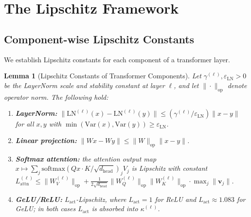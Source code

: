 \documentclass[11pt]{article}
\newtheorem{lemma}{Lemma}
\begin{document}
\section{The Lipschitz Framework}
\label{sec:lipschitz}

\subsection{Component-wise Lipschitz Constants}

We establish Lipschitz constants for each component of a transformer layer.

\begin{lemma}[Lipschitz Constants of Transformer Components]
\label{lem:components}
Let $\gamma^{(\ell)}, \varepsilon_{\mathrm{LN}} > 0$ be the LayerNorm scale and
stability constant at layer $\ell$, and let $\|\cdot\|_{\mathrm{op}}$ denote
operator norm.  The following hold:
\begin{enumerate}[leftmargin=2em,label=(\alph*)]
  \item \textbf{LayerNorm:} $\|\mathrm{LN}^{(\ell)}(x) - \mathrm{LN}^{(\ell)}(y)\|
        \leq (\gamma^{(\ell)}/\varepsilon_{\mathrm{LN}}) \|x - y\|$ for all $x,y$
        with $\min(\mathrm{Var}(x), \mathrm{Var}(y)) \geq \varepsilon_{\mathrm{LN}}$.
  \item \textbf{Linear projection:} $\|Wx - Wy\| \leq \|W\|_{\mathrm{op}}\|x-y\|$.
  \item \textbf{Softmax attention:} the attention output map
        $x \mapsto \sum_j \mathrm{softmax}(Qx \cdot K/\sqrt{d_{\mathrm{head}}})_j V_j$
        is Lipschitz with constant $L_{\mathrm{attn}}^{(\ell)} \leq
        \|W_V^{(\ell)}\|_{\mathrm{op}} + \tfrac{1}{2\sqrt{d_{\mathrm{head}}}}
        \|W_Q^{(\ell)}\|_{\mathrm{op}}\|W_K^{(\ell)}\|_{\mathrm{op}}
        \cdot \max_j\|\mathbf{v}_j\|$.
  \item \textbf{GeLU/ReLU:} $L_{\mathrm{act}}$-Lipschitz, where $L_{\mathrm{act}} = 1$ for ReLU and $L_{\mathrm{act}} \approx 1.083$ for GeLU; in both cases $L_{\mathrm{act}}$ is absorbed into $\kappa^{(\ell)}$.
\end{enumerate}
\end{lemma}
\end{document}
